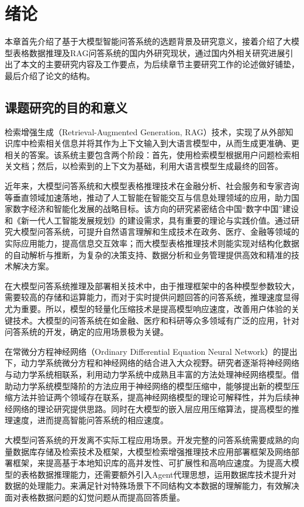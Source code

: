 \chapter{绪论}
\label{cha:intro}

本章首先介绍了基于大模型智能问答系统的选题背景及研究意义，接着介绍了大模型表格数据推理及RAG问答系统的国内外研究现状，通过国内外相关研究进展引出了本文的主要研究内容及工作要点，为后续章节主要研究工作的论述做好铺垫，最后介绍了论文的结构。
 
\section{课题研究的目的和意义}
检索增强生成（Retrieval-Augmented Generation, RAG）技术，实现了从外部知识库中检索相关信息并将其作为上下文输入到大语言模型中，从而生成更准确、更相关的答案。该系统主要包含两个阶段：首先，使用检索模型根据用户问题检索相关文档；然后，以检索到的上下文为基础，利用大语言模型生成最终的回答。

近年来，大模型问答系统和大模型表格推理技术在金融分析、社会服务和专家咨询等垂直领域加速落地，推动了人工智能在智能交互与信息处理领域的应用，助力国家数字经济和智能化发展的战略目标。该方向的研究紧密结合中国“数字中国”建设和《新一代人工智能发展规划》的建设需求，具有重要的理论与实践价值。通过研究大模型问答系统，可提升自然语言理解和生成技术在政务、医疗、金融等领域的实际应用能力，提高信息交互效率；而大模型表格推理技术则能实现对结构化数据的自动解析与推断，为复杂的决策支持、数据分析和业务管理提供高效和精准的技术解决方案。

在大模型问答系统推理及部署相关技术中，由于推理框架中的各种模型参数较大，需要较高的存储和运算能力，而对于实时提供问题回答的问答系统，推理速度显得尤为重要。所以，模型的轻量化压缩技术是提高模型响应速度，改善用户体验的关键技术。大模型的问答系统在如金融、医疗和科研等众多领域有广泛的应用\cite{1024008988.nh,1024532352.nh,1024651093.nh,1024744443.nh,1024917032.nh}，针对问答系统的开发，确定的应用场景极为关键。

在常微分方程神经网络（Ordinary Differential Equation Neural Network）\cite{chen2018neural}的提出下，动力学系统微分方程和神经网络的结合进入大众视野。研究者逐渐将神经网络与动力学系统相联系，利用动力学系统中成熟且丰富的方法处理神经网络模型。借助动力学系统模型降阶的方法应用于神经网络的模型压缩中，能够提出新的模型压缩方法并验证两个领域存在联系，提高神经网络模型的理论可解释性，并为后续神经网络的理论研究提供思路。同时在大模型的嵌入层应用压缩算法，提高模型的推理速度，进而提高智能问答系统的相应速度。

大模型问答系统的开发离不实际工程应用场景。开发完整的问答系统需要成熟的向量数据库存储及检索技术及框架，大模型检索增强推理技术应用部署框架及网络部署框架，来提高基于本地知识库的高并发性、可扩展性和高响应速度。为提高大模型的表格数据推理能力，还需要额外引入Agent代理思想，运用数据库技术提升对数据的处理能力。来满足针对特殊场景下不同结构文本数据的理解能力，有效解决面对表格数据问题的幻觉问题从而提高回答质量。


